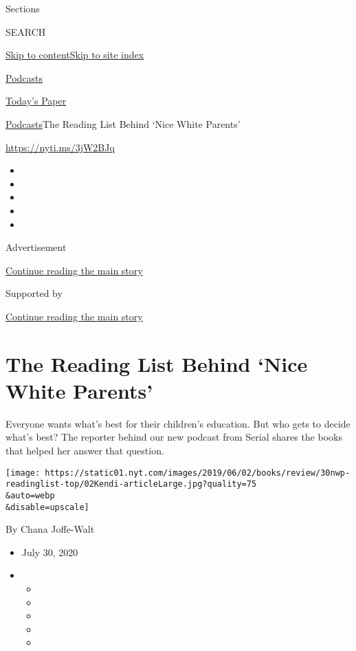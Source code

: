 Sections

SEARCH

\protect\hyperlink{site-content}{Skip to
content}\protect\hyperlink{site-index}{Skip to site index}

\href{https://www.nytimes.com/spotlight/podcasts}{Podcasts}

\href{https://myaccount.nytimes.com/auth/login?response_type=cookie\&client_id=vi}{}

\href{https://www.nytimes.com/section/todayspaper}{Today's Paper}

\href{/spotlight/podcasts}{Podcasts}\textbar{}The Reading List Behind
`Nice White Parents'

\url{https://nyti.ms/3jW2BJq}

\begin{itemize}
\item
\item
\item
\item
\item
\end{itemize}

Advertisement

\protect\hyperlink{after-top}{Continue reading the main story}

Supported by

\protect\hyperlink{after-sponsor}{Continue reading the main story}

\hypertarget{the-reading-list-behind-nice-white-parents}{%
\section{The Reading List Behind `Nice White
Parents'}\label{the-reading-list-behind-nice-white-parents}}

Everyone wants what's best for their children's education. But who gets
to decide what's best? The reporter behind our new podcast from Serial
shares the books that helped her answer that question.

\texttt{[image: https://static01.nyt.com/images/2019/06/02/books/review/30nwp-readinglist-top/02Kendi-articleLarge.jpg?quality=75\\\&auto=webp\\\&disable=upscale]}

By Chana Joffe-Walt

\begin{itemize}
\item
  July 30, 2020
\item
  \begin{itemize}
  \item
  \item
  \item
  \item
  \item
  \end{itemize}
\end{itemize}


